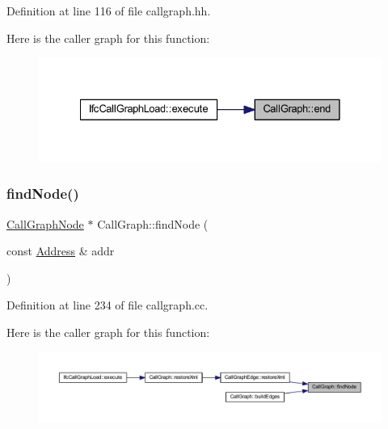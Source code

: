 Definition at line 116 of file callgraph.\+hh.

Here is the caller graph for this function\+:
\nopagebreak
\begin{figure}[H]
\begin{center}
\leavevmode
\includegraphics[width=328pt]{class_call_graph_ad363d6774131c216fcb865ad114aadd9_icgraph}
\end{center}
\end{figure}
\mbox{\label{class_call_graph_afcb9ae755c10124ffae9e3808993a5bc}} 
\subsubsection{\texorpdfstring{findNode()}{findNode()}}
{\footnotesize\ttfamily \mbox{\hyperlink{class_call_graph_node}{Call\+Graph\+Node}} $\ast$ Call\+Graph\+::find\+Node (\begin{DoxyParamCaption}\item[{const \mbox{\hyperlink{class_address}{Address}} \&}]{addr }\end{DoxyParamCaption})}



Definition at line 234 of file callgraph.\+cc.

Here is the caller graph for this function\+:
\nopagebreak
\begin{figure}[H]
\begin{center}
\leavevmode
\includegraphics[width=350pt]{class_call_graph_afcb9ae755c10124ffae9e3808993a5bc_icgraph}
\end{center}
\end{figure}
\mbox{\label{class_call_graph_a8c6cd0bdd5cfc3e3e5b34890820de311}} 
